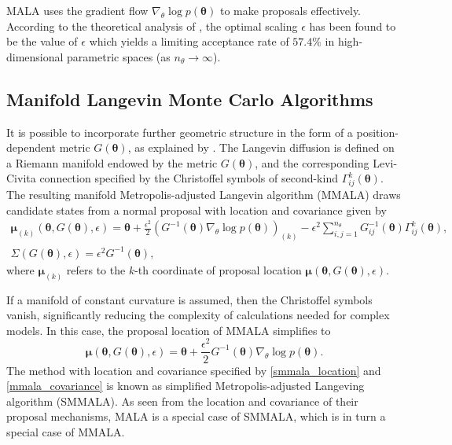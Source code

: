 \documentclass[twoside,11pt]{article}
\begin{document}
MALA uses the gradient flow $\nabla_{\theta}\log{p(\boldsymbol{\theta})}$ to make proposals effectively. According to the 
theoretical analysis of \cite{rob_ros__opt}, the optimal scaling $\epsilon$ has been found to be the value of $\epsilon$ 
which yields a limiting acceptance rate of $57.4\%$ in high-dimensional parametric spaces (as $n_{\theta}\rightarrow\infty$).

\subsection{Manifold Langevin Monte Carlo Algorithms}
\label{smmala_section}

It is possible to incorporate further geometric structure in the form of a position-dependent metric 
$G(\boldsymbol{\theta})$, as explained by \cite{gir_cal__rie}. The Langevin diffusion is defined on a Riemann manifold 
endowed by the metric $G(\boldsymbol{\theta})$, and the corresponding Levi-Civita connection specified by the Christoffel 
symbols of second-kind $\Gamma^{k}_{ij}(\boldsymbol{\theta})$. The resulting manifold Metropolis-adjusted Langevin algorithm 
(MMALA) draws candidate states from a normal proposal with location and covariance given by
\begin{eqnarray}
\label{mmala_location}
\boldsymbol{\mu}_{(k)}(\boldsymbol{\theta}, G(\boldsymbol{\theta}), \epsilon) =
\boldsymbol{\theta}+
\frac{\epsilon^2}{2}(G^{-1}(\boldsymbol{\theta})\nabla_{\theta}\log{p(\boldsymbol{\theta})})_{(k)}-
\epsilon^2\sum_{i,j=1}^{n_\theta}G^{-1}_{ij}(\boldsymbol{\theta})\Gamma^{k}_{ij}(\boldsymbol{\theta}),\\
\label{mmala_covariance}
\Sigma(G(\boldsymbol{\theta}), \epsilon) = \epsilon^2 G^{-1}(\boldsymbol{\theta}),
\end{eqnarray}
where $\boldsymbol{\mu}_{(k)}$ refers to the $k$-th coordinate of proposal location
$\boldsymbol{\mu}(\boldsymbol{\theta}, G(\boldsymbol{\theta}), \epsilon)$.

If a manifold of constant curvature is assumed, then the Christoffel symbols vanish, significantly reducing the complexity 
of calculations needed for complex models. In this case, the proposal location of MMALA simplifies to
\begin{equation}
\label{smmala_location}
\boldsymbol{\mu}(\boldsymbol{\theta}, G(\boldsymbol{\theta}), \epsilon) =
\boldsymbol{\theta}+
\frac{\epsilon^2}{2}G^{-1}(\boldsymbol{\theta})\nabla_{\theta}\log{p(\boldsymbol{\theta})}.
\end{equation}
The method with location and covariance specified by \eqref{smmala_location} and \eqref{mmala_covariance} is known as 
simplified Metropolis-adjusted Langeving algorithm (SMMALA). As seen from the location and covariance of their proposal 
mechanisms, MALA is a special case of SMMALA, which is in turn a special case of MMALA.
\end{document}
